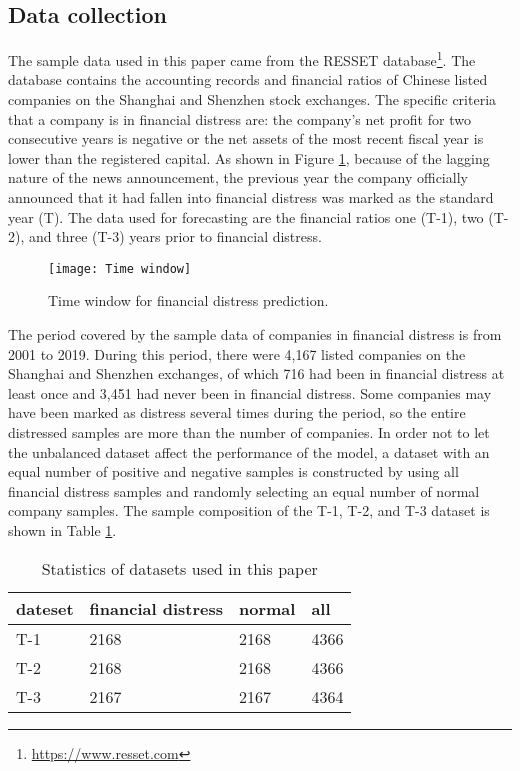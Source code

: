 \documentclass[review]{elsarticle}
\begin{document}
\subsection{Data collection}
The sample data used in this paper came from the RESSET database\footnote{\url{https://www.resset.com}}. The database contains the accounting records and financial ratios of Chinese listed companies on the Shanghai and Shenzhen stock exchanges. The specific criteria that a company is in financial distress are: the company's net profit for two consecutive years is negative or the net assets of the most recent fiscal year is lower than the registered capital. As shown in Figure \ref{fig: Time window}, because of the lagging nature of the news announcement, the previous year the company officially announced that it had fallen into financial distress was marked as the standard year (T). The data used for forecasting are the financial ratios one (T-1), two (T-2), and three (T-3) years prior to financial distress.

\begin{figure}[H]
    \centering
    \texttt{[image: Time window]}
    \caption{Time window for financial distress prediction.}
    \label{fig: Time window}
\end{figure}

The period covered by the sample data of companies in financial distress is from 2001 to 2019. During this period, there were 4,167 listed companies on the Shanghai and Shenzhen exchanges, of which 716 had been in financial distress at least once and 3,451 had never been in financial distress. Some companies may have been marked as distress several times during the period, so the entire distressed samples are more than the number of companies. In order not to let the unbalanced dataset affect the performance of the model, a dataset with an equal number of positive and negative samples is constructed by using all financial distress samples and randomly selecting an equal number of normal company samples. The sample composition of the T-1, T-2, and T-3 dataset is shown in Table \ref{table: Statistics}.

\begin{table}[H]\footnotesize
    \centering
    \caption{Statistics of datasets used in this paper}
    \label{table: Statistics}
    \begin{tabular}{llll}
    \hline
    dateset & financial distress & normal & all  \\ \hline
    T-1     & 2168               & 2168   & 4366 \\
    T-2     & 2168               & 2168   & 4366 \\
    T-3     & 2167               & 2167   & 4364 \\ \hline
    \end{tabular}
\end{table}
\end{document}
